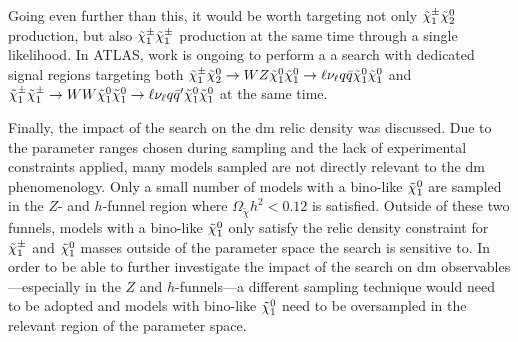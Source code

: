 Going even further than this, it would be worth targeting not only $\tilde{\chi}_1^\pm\tilde{\chi}_2^0$ production, but also $\tilde{\chi}_1^\pm\tilde{\chi}_1^\pm$ production at the same time through a single likelihood. In ATLAS, work is ongoing to perform a \eg a \onelepton search with dedicated signal regions targeting both $\tilde{\chi}_1^\pm\tilde{\chi}_2^0 \rightarrow WZ\tilde{\chi}_1^0\tilde{\chi}_1^0\rightarrow \ell\nu_\ell q\bar{q} \tilde{\chi}_1^0\tilde{\chi}_1^0$ and $\tilde{\chi}_1^\pm\tilde{\chi}_1^\pm \rightarrow WW\tilde{\chi}_1^0\tilde{\chi}_1^0\rightarrow \ell\nu_\ell q\bar{q}' \tilde{\chi}_1^0\tilde{\chi}_1^0$ at the same time. 

Finally, the impact of the \onelepton search on the \gls{dm} relic density was discussed. Due to the parameter ranges chosen during sampling and the lack of experimental constraints applied, many models sampled are not directly relevant to the \gls{dm} phenomenology. Only a small number of models with a bino-like $\tilde{\chi}_1^0$ are sampled in the $Z$- and $h$-funnel region where $\Omega_{\tilde{\chi}} h^2 < 0.12$ is satisfied. Outside of these two funnels, models with a bino-like $\tilde{\chi}_1^0$ only satisfy the relic density constraint for $\tilde{\chi}_1^\pm$ and $\tilde{\chi}_1^0$ masses outside of the parameter space the \onelepton search is sensitive to. In order to be able to further investigate the impact of the \onelepton search on \gls{dm} observables---especially in the $Z$ and $h$-funnels---a different sampling technique would need to be adopted and models with bino-like $\tilde{\chi}_1^0$ need to be oversampled in the relevant region of the parameter space. 



